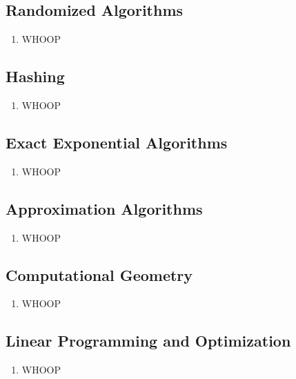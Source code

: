 \subsection{Randomized Algorithms}
\begin{enumerate}
  \item WHOOP
\end{enumerate}
\newpage

\subsection{Hashing}
\begin{enumerate}
  \item WHOOP
\end{enumerate}
\newpage

\subsection{Exact Exponential Algorithms}
\begin{enumerate}
  \item WHOOP
\end{enumerate}
\newpage

\subsection{Approximation Algorithms}
\begin{enumerate}
  \item WHOOP
\end{enumerate}
\newpage

\subsection{Computational Geometry}
\begin{enumerate}
  \item WHOOP
\end{enumerate}
\newpage

\subsection{Linear Programming and Optimization}
\begin{enumerate}
  \item WHOOP
\end{enumerate}
\newpage